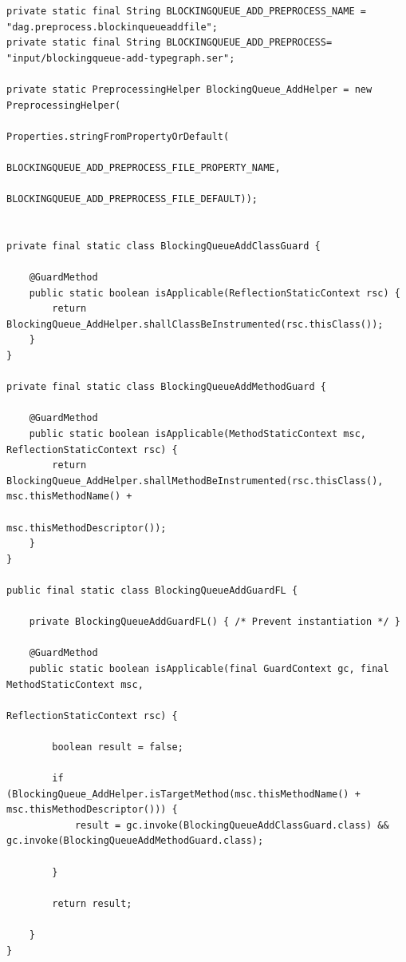 \documentclass[]{usiinfthesis}
\begin{document}
\vspace*{0.5cm}
\begin{verbatim}
private static final String BLOCKINGQUEUE_ADD_PREPROCESS_NAME = "dag.preprocess.blockinqueueaddfile";
private static final String BLOCKINGQUEUE_ADD_PREPROCESS= "input/blockingqueue-add-typegraph.ser";

private static PreprocessingHelper BlockingQueue_AddHelper = new PreprocessingHelper(
                                                    Properties.stringFromPropertyOrDefault(
                                                            BLOCKINGQUEUE_ADD_PREPROCESS_FILE_PROPERTY_NAME,
                                                            BLOCKINGQUEUE_ADD_PREPROCESS_FILE_DEFAULT));


private final static class BlockingQueueAddClassGuard {

    @GuardMethod
    public static boolean isApplicable(ReflectionStaticContext rsc) {
        return BlockingQueue_AddHelper.shallClassBeInstrumented(rsc.thisClass());
    }
}

private final static class BlockingQueueAddMethodGuard {

    @GuardMethod
    public static boolean isApplicable(MethodStaticContext msc, ReflectionStaticContext rsc) {
        return BlockingQueue_AddHelper.shallMethodBeInstrumented(rsc.thisClass(), msc.thisMethodName() +
                                                                      msc.thisMethodDescriptor());
    }
}

public final static class BlockingQueueAddGuardFL {

    private BlockingQueueAddGuardFL() { /* Prevent instantiation */ }

    @GuardMethod
    public static boolean isApplicable(final GuardContext gc, final MethodStaticContext msc,
                                                                ReflectionStaticContext rsc) {

        boolean result = false;

        if (BlockingQueue_AddHelper.isTargetMethod(msc.thisMethodName() + msc.thisMethodDescriptor())) {
            result = gc.invoke(BlockingQueueAddClassGuard.class) && gc.invoke(BlockingQueueAddMethodGuard.class);

        }

        return result;

    }
}
\end{verbatim}
\vspace*{0.5cm}
 
\end{document}
